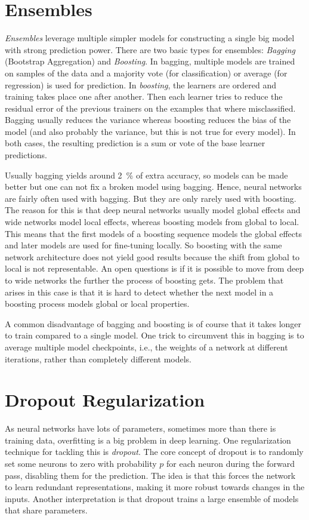 	\section{Ensembles}
		\emph{Ensembles} leverage multiple simpler models for constructing a single big model with strong prediction power. There are two basic types for ensembles: \emph{Bagging} (Bootstrap Aggregation) and \emph{Boosting}. In bagging, multiple models are trained on samples of the data and a majority vote (for classification) or average (for regression) is used for prediction. In \emph{boosting}, the learners are ordered and training takes place one after another. Then each learner tries to reduce the residual error of the previous trainers on the examples that where misclassified. Bagging usually reduces the variance whereas boosting reduces the bias of the model (and also probably the variance, but this is not true for every model). In both cases, the resulting prediction is a sum or vote of the base learner predictions.

		Usually bagging yields around \SI{2}{\percent} of extra accuracy, so models can be made better but one can not fix a broken model using bagging. Hence, neural networks are fairly often used with bagging. But they are only rarely used with boosting. The reason for this is that deep neural networks usually model global effects and wide networks model local effects, whereas boosting models from global to local. This means that the first models of a boosting sequence models the global effects and later models are used for fine-tuning locally. So boosting with the same network architecture does not yield good results because the shift from global to local is not representable. An open questions is if it is possible to move from deep to wide networks the further the process of boosting gets. The problem that arises in this case is that it is hard to detect whether the next model in a boosting process models global or local properties.

		A common disadvantage of bagging and boosting is of course that it takes longer to train compared to a single model. One trick to circumvent this in bagging is to average multiple model checkpoints, i.e., the weights of a network at different iterations, rather than completely different models.

	\section{Dropout Regularization}
		As neural networks have lots of parameters, sometimes more than there is training data, overfitting is a big problem in deep learning. One regularization technique for tackling this is \emph{dropout}. The core concept of dropout is to randomly set some neurons to zero with probability \(p\) for each neuron during the forward pass, disabling them for the prediction. The idea is that this forces the network to learn redundant representations, making it more robust towards changes in the inputs. Another interpretation is that dropout trains a large ensemble of models that share parameters.

